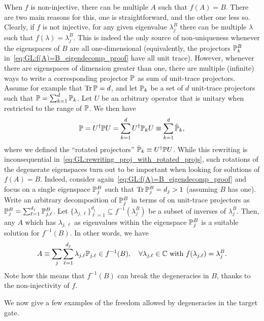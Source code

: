 When $f$ is non-injective, there can be multiple $A$ such that $f(A)=B$. There are two main reasons for this, one is straightforward, and the other one less so.
Clearly, if $f$ is not injective, for any given eigenvalue $\lambda_j^B$ there can be multiple $\lambda$ such that $f(\lambda)=\lambda_j^B$. This is indeed the only source of non-uniqueness whenever the eigenspaces of $B$ are all one-dimensional (equivalently, the projectors ${\mathbb{P}}_k^B$ in~\cref{eq:GL:f(A)=B_eigendecomp_proof} have all unit trace).
However, whenever there are eigenspaces of dimension greater than one, there are multiple (infinite) ways to write a corresponding projector ${\mathbb{P}}$ as sum of unit-trace projectors. Assume for example that $\Tr\PP=d$, and let ${\mathbb{P}}_k$ be a set of $d$ unit-trace projectors such that ${\mathbb{P}}=\sum_{k=1}^d {\mathbb{P}}_k$. Let $U$ be an arbitrary operator that is unitary when restricted to the range of ${\mathbb{P}}$.
We then have
\begin{equation}
    {\mathbb{P}}=U^\dagger {\mathbb{P}} U =\sum_{k=1}^d U^\dagger {\mathbb{P}}_k U
    \equiv \sum_{k=1}^d \tilde{{\mathbb{P}}}_k,
    \label{eq:GL:rewriting_proj_with_rotated_projs}
\end{equation}
where we defined the ``rotated projectors'' $\tilde{{\mathbb{P}}}_k\equiv U^\dagger {\mathbb{P}} U$.
While this rewriting is inconsequential in~\cref{eq:GL:rewriting_proj_with_rotated_projs}, such rotations of the degenerate eigenspaces turn out to be important when looking for solutions of $f(A)=B$.
Indeed, consider again~\cref{eq:GL:f(A)=B_eigendecomp_proof} and focus on a single eigenspace ${\mathbb{P}}_j^B$ such that $\Tr\PP_j^B=d_j>1$ (assuming $B$ has one). Write an arbitrary decomposition of ${\mathbb{P}}_j^B$ in terms of on unit-trace projectors as ${\mathbb{P}}_j^B=\sum_{\ell=1}^{d_j}{\mathbb{P}}^B_{j,\ell}$.
Let $\{\lambda_{j,\ell}\}_{\ell=1}^{d_j}\subseteq f^{-1}(\lambda_j^B)$ be a subset of inverses of $\lambda_j^B$. Then, any $A$ which has $\lambda_{j,\ell}$ as eigenvalues within the eigenspace ${\mathbb{P}}_j^B$ is a suitable solution for $f^{-1}(B)$.
In other words, we have
\begin{equation}
    A \equiv \sum_j \sum_{\ell=1}^{d_j} \lambda_{j,\ell} {\mathbb{P}}_{j,\ell}\in f^{-1}(B),
    \quad \forall \lambda_{j,\ell}\in{\mathbb{C}} \text{ with } f(\lambda_{j,\ell})=\lambda_j^B.
    \label{eq:GL:general_form_f-1B}
\end{equation}
Note how this means that $f^{-1}(B)$ can break the degeneracies in $B$, thanks to the non-injectivity of $f$.

We now give a few examples of the freedom allowed by degeneracies in the target gate.

